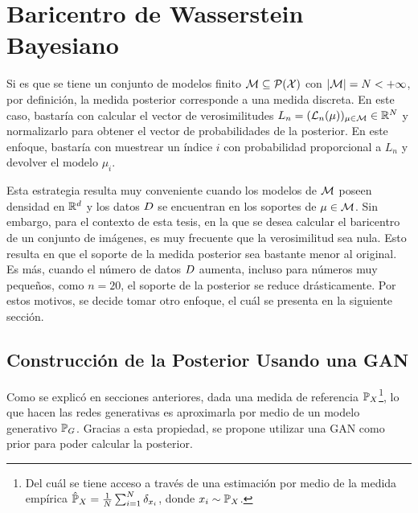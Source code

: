 \section{Baricentro de Wasserstein Bayesiano}\label{sec:bwb}  %


Si es que se tiene un conjunto de modelos finito $\Models \subseteq \ProbSpace[\cX] $ con $| \Models | = N < + \infty$, por definición, la medida posterior corresponde a una medida discreta. En este caso, bastaría con calcular el vector de verosimilitudes $L_n = (\cL_n(\mu))_{\mu \in \Models} \in \R^N$ y normalizarlo para obtener el vector de probabilidades de la posterior. En este enfoque, bastaría con muestrear un índice $i$ con probabilidad proporcional a $L_n$ y devolver el modelo $\mu_i$.

Esta estrategia resulta muy conveniente cuando los modelos de $\Manifold$ poseen densidad en $\R^d$ y los datos $\Data$ se encuentran en los soportes de $\mu\in \Manifold$. Sin embargo, para el contexto de esta tesis, en la que se desea calcular el baricentro de un conjunto de imágenes, es muy frecuente que la verosimilitud sea nula. Esto resulta en que el soporte de la medida posterior sea bastante menor al original. Es más, cuando el número de datos $\Data$ aumenta, incluso para números muy pequeños, como $n=20$, el soporte de la posterior se reduce drásticamente. Por estos motivos, se decide tomar otro enfoque, el cuál se presenta en la siguiente sección.


\subsection{Construcción de la Posterior Usando una GAN}\label{ssec:construccion-posterior}  %

Como se explicó en secciones anteriores,
dada una medida de referencia $\Prob_X$\footnote{Del cuál se tiene acceso a través de una estimación por medio de la medida empírica $\hat\Prob_X = \frac{1}{N}\sum_{i=1}^{N} \delta_{x_i}$, donde $x_i \sim \Prob_X$.}, lo que hacen las redes generativas es aproximarla por medio de un modelo generativo $\Prob_G$. Gracias a esta propiedad, se propone utilizar una GAN como prior para poder calcular la posterior.

